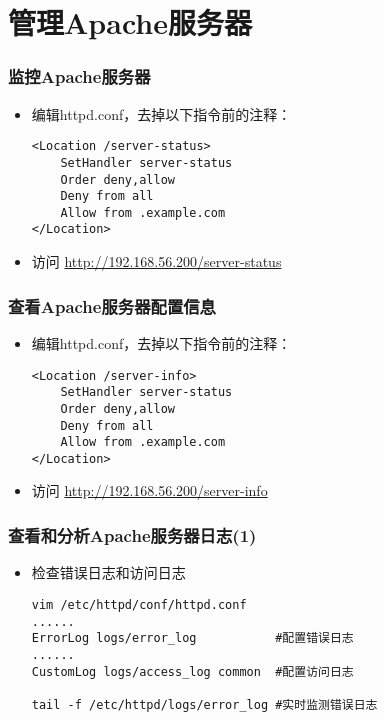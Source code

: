 \documentclass[xcolor=svgnames,presentation]{beamer}
\begin{document}
\section{管理Apache服务器}
\label{sec-5}
\begin{frame}[fragile]
\frametitle{监控Apache服务器}
\label{sec-5-1}
\begin{itemize}

\item 编辑httpd.conf，去掉以下指令前的注释：\\
\label{sec-5-1-1}%
\begin{verbatim}
<Location /server-status>
    SetHandler server-status
    Order deny,allow
    Deny from all
    Allow from .example.com
</Location>
\end{verbatim}

\item 访问 \href{http://192.168.56.200/server-status}{http://192.168.56.200/server-status}
\label{sec-5-1-2}%
\end{itemize} %
\end{frame}
\begin{frame}[fragile]
\frametitle{查看Apache服务器配置信息}
\label{sec-5-2}
\begin{itemize}

\item 编辑httpd.conf，去掉以下指令前的注释：\\
\label{sec-5-2-1}%
\begin{verbatim}
<Location /server-info>
    SetHandler server-status
    Order deny,allow
    Deny from all
    Allow from .example.com
</Location>
\end{verbatim}

\item 访问 \href{http://192.168.56.200/server-info}{http://192.168.56.200/server-info}
\label{sec-5-2-2}%
\end{itemize} %
\end{frame}
\begin{frame}[fragile]
\frametitle{查看和分析Apache服务器日志(1)}
\label{sec-5-3}
\begin{itemize}

\item 检查错误日志和访问日志\\
\label{sec-5-3-1}%
\begin{verbatim}
vim /etc/httpd/conf/httpd.conf
......
ErrorLog logs/error_log           #配置错误日志
......
CustomLog logs/access_log common  #配置访问日志

tail -f /etc/httpd/logs/error_log #实时监测错误日志
\end{verbatim}
\end{itemize} %
\end{frame}
\end{document}
